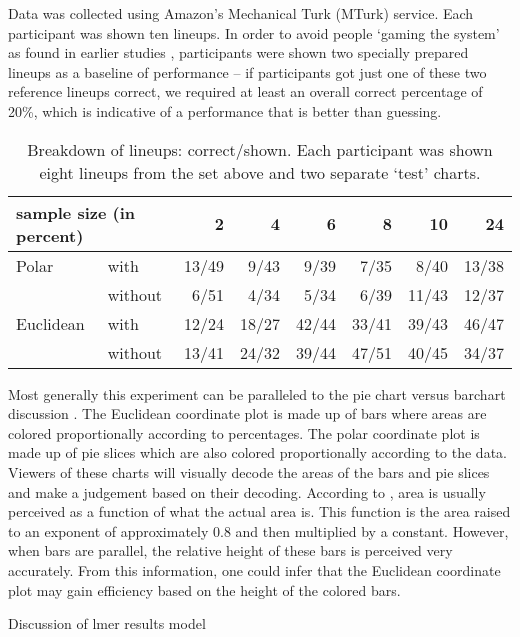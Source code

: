 Data was collected using Amazon's Mechanical Turk (MTurk) service. Each participant was shown ten lineups. In order to avoid people `gaming the system' as found in earlier studies \cite{heer:2010, kosara:2010}, participants were shown two specially prepared lineups as a baseline of performance -- if participants got just one of these two reference lineups correct, we required at least an overall correct percentage of 20\%, which is indicative of a performance that is better than guessing.

\begin{table}[hbtp]
\resizebox{\linewidth}{!} {
	\begin{tabular}{ll|@{}r|@{}r|@{}r|@{}r|@{}r|@{}r}
	\multicolumn{2}{l}{sample size (in percent)}  & 2 & 4 & 6 & 8 & 10 & 24 \\ [1pt] \hline
	Polar & with & 13/49& 9/43 & 9/39 & 7/35 & 8/40 & 13/38 \\
	& without & 6/51&   4/34 &  5/34 &  6/39 & 11/43 &  12/37\\ [1pt] \hline
	Euclidean & with &12/24& 18/27 & 42/44 & 33/41 & 39/43 & 46/47\\
	& without & 13/41 &24/32& 39/44 & 47/51 & 40/45 & 34/37\\
	\end{tabular}
	}
\caption{\label{tbl:treatment} Breakdown of lineups: correct/shown. Each participant was shown eight lineups from the set above and two separate `test' charts. }
\end{table}

Most generally this experiment can be paralleled to the pie chart versus barchart discussion \cite{}. 
The Euclidean coordinate plot is made up of bars where areas are colored proportionally according to percentages. The polar coordinate plot is made up of pie slices which are also colored proportionally according to the data. 
Viewers of these charts will visually decode the areas of the bars and pie slices and make a judgement based on their decoding. According to  \citet[page=40]{kosslyn:2006}, area is usually perceived as a function of what the actual area is. This function is the area raised to an exponent of approximately 0.8 and then multiplied by a constant. However, when bars are parallel, the relative height of these bars is perceived very accurately. From this information, one could infer that the Euclidean coordinate plot may gain efficiency based on the height of the colored bars. 


Discussion of lmer results
model 



